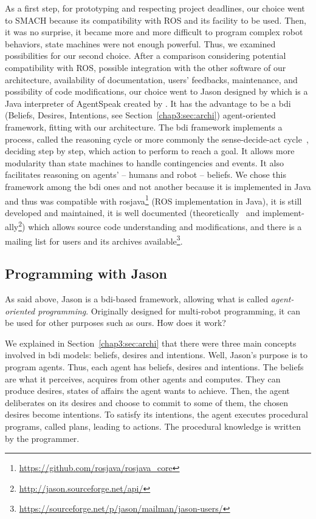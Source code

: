 \documentclass[a4paper,11pt,twoside]{StyleThese}
\begin{document}
As a first step, for prototyping and respecting project deadlines, our choice went to SMACH because its compatibility with ROS and its facility to be used. Then, it was no surprise, it became more and more difficult to program complex robot behaviors, state machines were not enough powerful. Thus, we examined possibilities for our second choice. After a comparison considering potential compatibility with ROS, possible integration with the other software of our architecture, availability of documentation, users' feedbacks, maintenance, and possibility of code modifications, our choice went to Jason designed by \cite{bordini_2007_jason} which is a Java interpreter of AgentSpeak created by \cite{rao_1996_agentspeak}. It has the advantage to be a \acrshort{bdi} (Beliefs, Desires, Intentions, see Section~\ref{chap3:sec:archi}) agent-oriented framework, fitting with our architecture. The \acrshort{bdi} framework implements a process, called the reasoning cycle or more commonly the sense-decide-act cycle~\citep{albus_1991_outline}, deciding step by step, which action to perform to reach a goal. It allows more modularity than state machines to handle contingencies and events. It also facilitates reasoning on agents' -- humans and robot -- beliefs. We chose this framework among the \acrshort{bdi} ones and not another because it is implemented in Java and thus was compatible with rosjava\footnote{\url{https://github.com/rosjava/rosjava_core}} (\ie ROS implementation in Java), it is still developed and maintained, it is well documented (theoretically~\citep{bordini_2007_jason} and implement-ally\footnote{\url{http://jason.sourceforge.net/api/}}) which allows source code understanding and modifications, and there is a mailing list for users and its archives available\footnote{\url{https://sourceforge.net/p/jason/mailman/jason-users/}}.

\subsection{Programming with Jason}\label{chap4:subsec:jason}
As said above, Jason is a \acrshort{bdi}-based framework, allowing what is called \textit{agent-oriented programming}. Originally designed for multi-robot programming, it can be used for other purposes such as ours. How does it work?

We explained in Section~\ref{chap3:sec:archi} that there were three main concepts involved in \acrshort{bdi} models: beliefs, desires and intentions. Well, Jason's purpose is to program agents. Thus, each agent has beliefs, desires and intentions. The beliefs are what it perceives, acquires from other agents and computes. They can produce desires, \ie states of affairs the agent wants to achieve. Then, the agent deliberates on its desires and choose to commit to some of them, \ie the chosen desires become intentions. To satisfy its intentions, the agent executes procedural programs, called plans, leading to actions. The procedural knowledge is written by the programmer.
\end{document}
